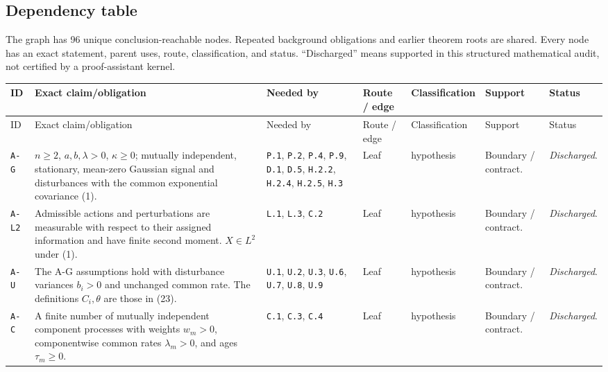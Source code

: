 \documentclass[11pt,letterpaper]{article}
\begin{document}
\begin{landscape}
\section{Dependency table}
The graph has 96 unique conclusion-reachable nodes. Repeated background obligations and earlier theorem roots are shared. Every node has an exact statement, parent uses, route, classification, and status. ``Discharged'' means supported in this structured mathematical audit, not certified by a proof-assistant kernel.

{\footnotesize \begin{longtable}{>{\raggedright\arraybackslash}p{.07\linewidth}>{\raggedright\arraybackslash}p{.355\linewidth}>{\raggedright\arraybackslash}p{.12\linewidth}>{\raggedright\arraybackslash}p{.09\linewidth}>{\raggedright\arraybackslash}p{.10\linewidth}>{\raggedright\arraybackslash}p{.10\linewidth}>{\raggedright\arraybackslash}p{.08\linewidth}}
\toprule
ID & Exact claim/obligation & Needed by & Route / edge & Classification & Support & Status \\
\midrule\endfirsthead
\toprule
ID & Exact claim/obligation & Needed by & Route / edge & Classification & Support & Status \\
\midrule\endhead
\bottomrule\endfoot
\texttt{A-G} & $n\ge2$, $a,b,\lambda>0$, $\kappa\ge0$; mutually independent, stationary, mean-zero Gaussian signal and disturbances with the common exponential covariance (1). & \texttt{P.1}, \texttt{P.2}, \texttt{P.4}, \texttt{P.9}, \texttt{D.1}, \texttt{D.5}, \texttt{H.2.2}, \texttt{H.2.4}, \texttt{H.2.5}, \texttt{H.3} & Leaf & hypothesis & Boundary / contract. & \emph{Discharged}. \\[2pt]
\texttt{A-L2} & Admissible actions and perturbations are measurable with respect to their assigned information and have finite second moment. $X\in L^2$ under (1). & \texttt{L.1}, \texttt{L.3}, \texttt{C.2} & Leaf & hypothesis & Boundary / contract. & \emph{Discharged}. \\[2pt]
\texttt{A-U} & The A-G assumptions hold with disturbance variances $b_i>0$ and unchanged common rate. The definitions $C_i,\theta$ are those in (23). & \texttt{U.1}, \texttt{U.2}, \texttt{U.3}, \texttt{U.6}, \texttt{U.7}, \texttt{U.8}, \texttt{U.9} & Leaf & hypothesis & Boundary / contract. & \emph{Discharged}. \\[2pt]
\texttt{A-C} & A finite number of mutually independent component processes with weights $w_m>0$, componentwise common rates $\lambda_m>0$, and ages $\tau_m\ge0$. & \texttt{C.1}, \texttt{C.3}, \texttt{C.4} & Leaf & hypothesis & Boundary / contract. & \emph{Discharged}. \\[2pt]

\end{longtable}}
\end{landscape}
\end{document}
